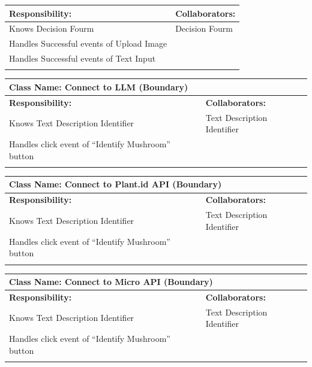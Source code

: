 \documentclass[]{article}
\begin{document}
\begin{itemize}
\begin{table}[ht]
\begin{tabular}{|p{6cm}|p{6cm}|}
		\hline
		\textbf{Responsibility:} & \textbf{Collaborators:} \\
		\hline
		Knows Decision Fourm & Decision Fourm \\
		Handles Successful events of Upload Image & \\
		Handles Successful events of Text Input & \\
		\vspace{1in} & \\
		\hline
		\end{tabular}
	\end{table}
	\begin{table}[ht]
		\centering
		\begin{tabular}{|p{6cm}|p{6cm}|}
		\hline 
		\multicolumn{2}{|l|}{\textbf{Class Name: Connect to LLM  (Boundary)}} \\
		\hline
		\textbf{Responsibility:} & \textbf{Collaborators:} \\
		\hline
		Knows Text Description Identifier & Text Description Identifier \\
		Handles click event of “Identify Mushroom” button & \\
		\vspace{1in} & \\
		\hline
		\end{tabular}
	\end{table}
	\begin{table}[ht]
		\centering
		\begin{tabular}{|p{6cm}|p{6cm}|}
		\hline 
		\multicolumn{2}{|l|}{\textbf{Class Name: Connect to Plant.id API (Boundary)}} \\
		\hline
		\textbf{Responsibility:} & \textbf{Collaborators:} \\
		\hline
		Knows Text Description Identifier & Text Description Identifier \\
		Handles click event of “Identify Mushroom” button & \\
		\vspace{1in} & \\
		\hline
		\end{tabular}
	\end{table}
	\begin{table}[ht]
		\centering
		\begin{tabular}{|p{6cm}|p{6cm}|}
		\hline 
		\multicolumn{2}{|l|}{\textbf{Class Name: Connect to  Micro API (Boundary)}} \\
		\hline
		\textbf{Responsibility:} & \textbf{Collaborators:} \\
		\hline
		Knows Text Description Identifier & Text Description Identifier \\
		Handles click event of “Identify Mushroom” button & \\
		\vspace{1in} & \\
		\hline
		\end{tabular}
	\end{table}


\end{itemize}
\end{document}
